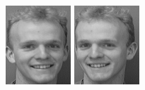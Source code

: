 \begin{figure}[ht]
 \includegraphics[width=\columnwidth/11]{ch3/figures/s5_3.png}
 \includegraphics[width=\columnwidth/11]{ch3/figures/s5_4.png}

\end{figure}
